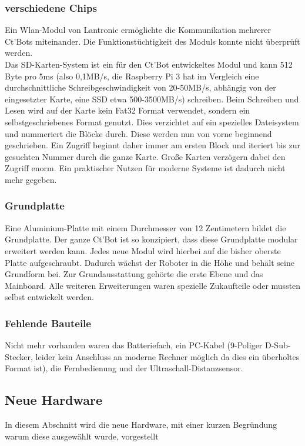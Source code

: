 \documentclass[twoside,11pt, a4paper]{report}
\begin{document}
	\subsubsection{verschiedene Chips}
	Ein Wlan-Modul von Lantronic ermöglichte die Kommunikation mehrerer Ct'Bots miteinander. Die Funktionstüchtigkeit des Moduls konnte nicht überprüft werden. \\
	Das SD-Karten-System ist ein für den Ct'Bot entwickeltes Modul und kann 512 Byte pro 5ms (also 0,1MB/s, die Raspberry Pi 3 hat im Vergleich eine durchschnittliche Schreibgeschwindigkeit von 20-50MB/s, abhängig von der eingesetzter Karte, eine SSD etwa 500-3500MB/s) schreiben. Beim Schreiben und Lesen wird auf der Karte kein Fat32 Format verwendet, sondern ein selbstgeschriebenes Format genutzt. Dies verzichtet auf ein spezielles Dateisystem und nummeriert die Blöcke durch. Diese werden nun von vorne beginnend geschrieben. Ein Zugriff beginnt daher immer am ersten Block und iteriert bis zur gesuchten Nummer durch die ganze Karte. Große Karten verzögern dabei den Zugriff enorm. Ein praktischer Nutzen für moderne Systeme ist dadurch nicht mehr gegeben. 
	
	\subsubsection{Grundplatte}
	Eine Aluminium-Platte mit einem Durchmesser von 12 Zentimetern bildet die Grundplatte. Der ganze Ct'Bot ist so konzipiert, dass diese Grundplatte modular erweitert werden kann. Jedes neue Modul wird hierbei auf die bisher oberste Platte aufgeschraubt. Dadurch wächst der Roboter in die Höhe und behält seine Grundform bei. Zur Grundausstattung gehörte die erste Ebene und das Mainboard. Alle weiteren Erweiterungen waren spezielle Zukaufteile oder mussten selbst entwickelt werden.
	
	\subsubsection{Fehlende Bauteile}
	Nicht mehr vorhanden waren das Batteriefach, ein PC-Kabel (9-Poliger D-Sub-Stecker, leider kein Anschluss an moderne Rechner möglich da dies ein überholtes Format ist), die Fernbedienung und der Ultraschall-Distanzsensor. 
	
	\subsection{Neue Hardware}
	In diesem Abschnitt wird die neue Hardware, mit einer kurzen Begründung warum diese ausgewählt wurde, vorgestellt
	
\end{document}
